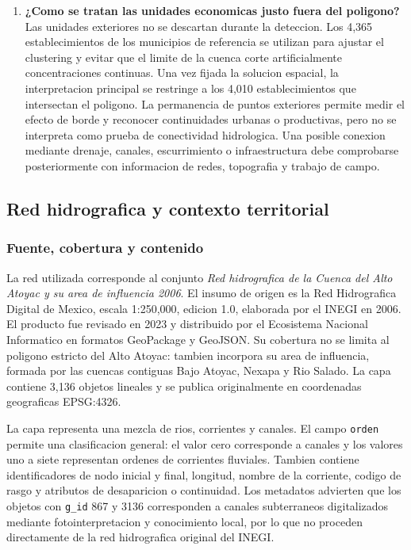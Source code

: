 \documentclass[11pt,letterpaper]{article}
\begin{document}
\begin{enumerate}
    \item \textbf{¿Como se tratan las unidades economicas justo fuera del poligono?}
    Las unidades exteriores no se descartan durante la deteccion. Los 4,365 establecimientos de los municipios de referencia se utilizan para ajustar el clustering y evitar que el limite de la cuenca corte artificialmente concentraciones continuas. Una vez fijada la solucion espacial, la interpretacion principal se restringe a los 4,010 establecimientos que intersectan el poligono. La permanencia de puntos exteriores permite medir el efecto de borde y reconocer continuidades urbanas o productivas, pero no se interpreta como prueba de conectividad hidrologica. Una posible conexion mediante drenaje, canales, escurrimiento o infraestructura debe comprobarse posteriormente con informacion de redes, topografia y trabajo de campo.
\end{enumerate}

\subsection{Red hidrografica y contexto territorial}

\subsubsection*{Fuente, cobertura y contenido}

La red utilizada corresponde al conjunto \textit{Red hidrografica de la Cuenca del Alto Atoyac y su area de influencia 2006}. El insumo de origen es la Red Hidrografica Digital de Mexico, escala 1:250,000, edicion 1.0, elaborada por el INEGI en 2006. El producto fue revisado en 2023 y distribuido por el Ecosistema Nacional Informatico en formatos GeoPackage y GeoJSON. Su cobertura no se limita al poligono estricto del Alto Atoyac: tambien incorpora su area de influencia, formada por las cuencas contiguas Bajo Atoyac, Nexapa y Rio Salado. La capa contiene 3,136 objetos lineales y se publica originalmente en coordenadas geograficas EPSG:4326.

La capa representa una mezcla de rios, corrientes y canales. El campo \texttt{orden} permite una clasificacion general: el valor cero corresponde a canales y los valores uno a siete representan ordenes de corrientes fluviales. Tambien contiene identificadores de nodo inicial y final, longitud, nombre de la corriente, codigo de rasgo y atributos de desaparicion o continuidad. Los metadatos advierten que los objetos con \texttt{g\_id} 867 y 3136 corresponden a canales subterraneos digitalizados mediante fotointerpretacion y conocimiento local, por lo que no proceden directamente de la red hidrografica original del INEGI.
\end{document}
